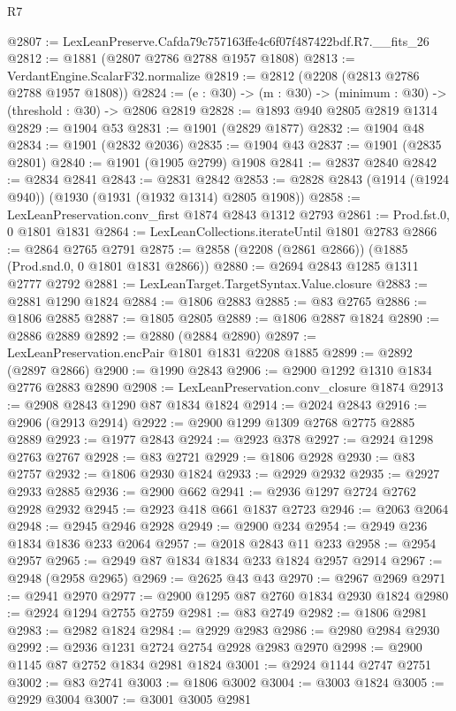 \begin{lexlean}{R7}
\begin{coremodule}
@2807 := LexLeanPreserve.Cafda79c757163ffe4c6f07f487422bdf.R7.__fits_26
@2812 := @1881 (@2807 @2786 @2788 @1957 @1808)
@2813 := VerdantEngine.ScalarF32.normalize
@2819 := @2812 (@2208 (@2813 @2786 @2788 @1957 @1808))
@2824 := (e : @30) -> (m : @30) -> (minimum : @30) -> (threshold : @30) -> @2806 @2819
@2828 := @1893 @940 @2805 @2819 @1314
@2829 := @1904 @53
@2831 := @1901 (@2829 @1877)
@2832 := @1904 @48
@2834 := @1901 (@2832 @2036)
@2835 := @1904 @43
@2837 := @1901 (@2835 @2801)
@2840 := @1901 (@1905 @2799) @1908
@2841 := @2837 @2840
@2842 := @2834 @2841
@2843 := @2831 @2842
@2853 := @2828 @2843 (@1914 (@1924 @940)) (@1930 (@1931 (@1932 @1314) @2805 @1908))
@2858 := LexLeanPreservation.conv_first @1874 @2843 @1312 @2793
@2861 := Prod.fst.{0, 0} @1801 @1831
@2864 := LexLeanCollections.iterateUntil @1801 @2783
@2866 := @2864 @2765 @2791
@2875 := @2858 (@2208 (@2861 @2866)) (@1885 (Prod.snd.{0, 0} @1801 @1831 @2866))
@2880 := @2694 @2843 @1285 @1311 @2777 @2792
@2881 := LexLeanTarget.TargetSyntax.Value.closure
@2883 := @2881 @1290 @1824
@2884 := @1806 @2883
@2885 := @83 @2765
@2886 := @1806 @2885
@2887 := @1805 @2805
@2889 := @1806 @2887 @1824
@2890 := @2886 @2889
@2892 := @2880 (@2884 @2890)
@2897 := LexLeanPreservation.encPair @1801 @1831 @2208 @1885
@2899 := @2892 (@2897 @2866)
@2900 := @1990 @2843
@2906 := @2900 @1292 @1310 @1834 @2776 @2883 @2890
@2908 := LexLeanPreservation.conv_closure @1874
@2913 := @2908 @2843 @1290 @87 @1834 @1824
@2914 := @2024 @2843
@2916 := @2906 (@2913 @2914)
@2922 := @2900 @1299 @1309 @2768 @2775 @2885 @2889
@2923 := @1977 @2843
@2924 := @2923 @378
@2927 := @2924 @1298 @2763 @2767
@2928 := @83 @2721
@2929 := @1806 @2928
@2930 := @83 @2757
@2932 := @1806 @2930 @1824
@2933 := @2929 @2932
@2935 := @2927 @2933 @2885
@2936 := @2900 @662
@2941 := @2936 @1297 @2724 @2762 @2928 @2932
@2945 := @2923 @418 @661 @1837 @2723
@2946 := @2063 @2064
@2948 := @2945 @2946 @2928
@2949 := @2900 @234
@2954 := @2949 @236 @1834 @1836 @233 @2064
@2957 := @2018 @2843 @11 @233
@2958 := @2954 @2957
@2965 := @2949 @87 @1834 @1834 @233 @1824 @2957 @2914
@2967 := @2948 (@2958 @2965)
@2969 := @2625 @43 @43
@2970 := @2967 @2969
@2971 := @2941 @2970
@2977 := @2900 @1295 @87 @2760 @1834 @2930 @1824
@2980 := @2924 @1294 @2755 @2759
@2981 := @83 @2749
@2982 := @1806 @2981
@2983 := @2982 @1824
@2984 := @2929 @2983
@2986 := @2980 @2984 @2930
@2992 := @2936 @1231 @2724 @2754 @2928 @2983 @2970
@2998 := @2900 @1145 @87 @2752 @1834 @2981 @1824
@3001 := @2924 @1144 @2747 @2751
@3002 := @83 @2741
@3003 := @1806 @3002
@3004 := @3003 @1824
@3005 := @2929 @3004
@3007 := @3001 @3005 @2981

\end{coremodule}
\end{lexlean}

